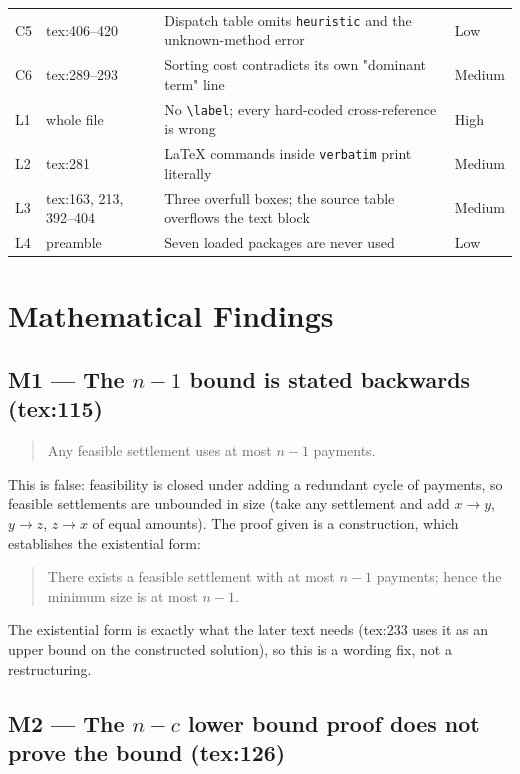 \documentclass[11pt]{article}
\begin{document}
\begin{table}[H]
\begin{tabular}{>{\raggedright\arraybackslash}p{} >{\raggedright\arraybackslash}p{}
>{\raggedright\arraybackslash}p{} >{\raggedright\arraybackslash}p{}}
C5 & tex:406--420 & Dispatch table omits \texttt{heuristic} and the unknown-method error & Low \\
C6 & tex:289--293 & Sorting cost contradicts its own "dominant term" line & Medium \\
L1 & whole file & No \texttt{\textbackslash label}; every hard-coded cross-reference is wrong & High \\
L2 & tex:281 & LaTeX commands inside \texttt{verbatim} print literally & Medium \\
L3 & tex:163, 213, 392--404 & Three overfull boxes; the source table overflows the text block & Medium \\
L4 & preamble & Seven loaded packages are never used & Low \\
\bottomrule
\end{tabular}
\end{table}

\section{Mathematical Findings}

\subsection{M1 --- The $n-1$ bound is stated backwards (tex:115)}

\begin{quote}
  Any feasible settlement uses at most $n-1$ payments.
\end{quote}

This is false: feasibility is closed under adding a redundant cycle of payments, so feasible settlements
are unbounded in size (take any settlement and add $x \to y$, $y \to z$, $z \to x$ of equal amounts).
The proof given is a construction, which establishes the existential form:

\begin{quote}
  There exists a feasible settlement with at most $n-1$ payments; hence the minimum size is at most $n-1$.
\end{quote}

The existential form is exactly what the later text needs (tex:233 uses it as an upper bound on the
constructed solution), so this is a wording fix, not a restructuring.

\subsection{M2 --- The $n-c$ lower bound proof does not prove the bound (tex:126)}
\end{document}
